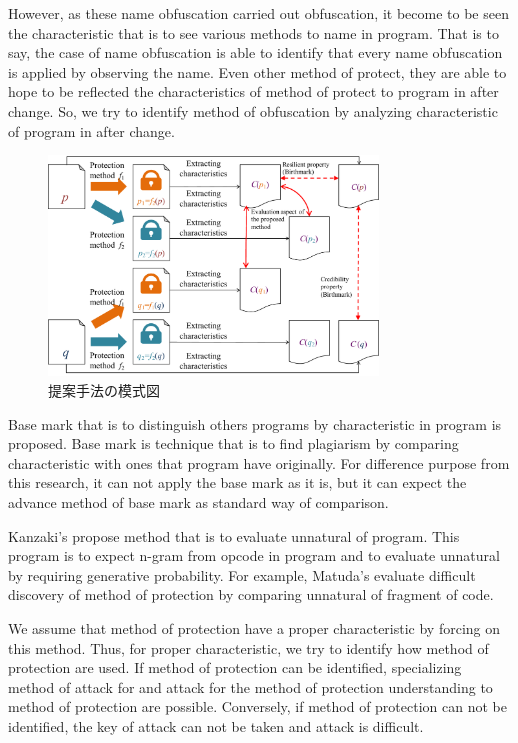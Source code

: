 \documentclass[conference]{IEEEtran}
\begin{document}
However, as these name obfuscation carried out obfuscation, it become to be seen the characteristic that is to see various methods to name in program.
That is to say, the case of name obfuscation is able to identify that every name obfuscation is applied by observing the name.
Even other method of protect, they are able to hope to be reflected the characteristics of method of protect to program in after change.
So, we try to identify method of obfuscation by analyzing characteristic of program in after change.

\begin{figure}[b]
  \centering
  \includegraphics[width=0.78\textwidth]{images/key_idea}
  \caption{提案手法の模式図}\label{fig:keyidea}
\end{figure}


Base mark that is to distinguish others programs by characteristic in program is proposed\cite{tamada05ieice}.
Base mark is technique that is to find plagiarism by comparing characteristic with ones that program have originally.
For difference purpose from this research, it can not apply the base mark as it is, but it can expect the advance method of base mark as standard way of comparison.

Kanzaki's propose method that is to evaluate unnatural of program\cite{kanzaki14ipsj}.
This program is to expect n-gram from opcode in program and to evaluate unnatural by requiring generative probability.
For example, Matuda's evaluate difficult discovery of method of protection by comparing unnatural of fragment of code\cite{matsuda15ipsj}.

We assume that method of protection have a proper characteristic by forcing on this method.
Thus, for proper characteristic, we try to identify how method of protection are used.
If method of protection can be identified, specializing method of attack for  and attack for the method of protection understanding to method of protection are possible.
Conversely, if method of protection can not be identified, the key of attack can not be taken  and attack is difficult.
\end{document}
